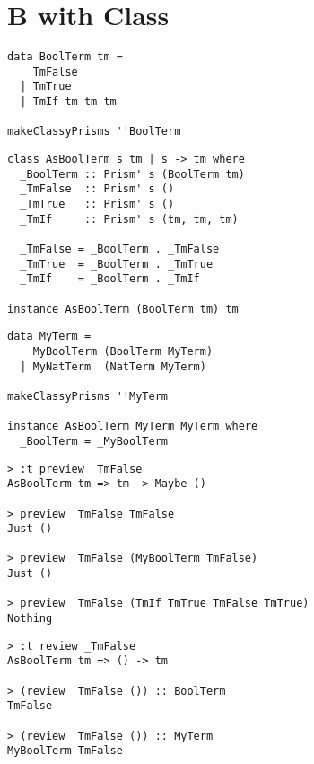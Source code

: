 \documentclass{beamer}
\begin{document}
\section{B with Class}

\begin{frame}[fragile]
  \begin{verbatim}
data BoolTerm tm =
    TmFalse
  | TmTrue
  | TmIf tm tm tm

makeClassyPrisms ''BoolTerm
  \end{verbatim}
\end{frame} 

\begin{frame}[fragile]
  \begin{verbatim}
class AsBoolTerm s tm | s -> tm where
  _BoolTerm :: Prism' s (BoolTerm tm)
  _TmFalse  :: Prism' s ()
  _TmTrue   :: Prism' s ()
  _TmIf     :: Prism' s (tm, tm, tm)

  _TmFalse = _BoolTerm . _TmFalse
  _TmTrue  = _BoolTerm . _TmTrue
  _TmIf    = _BoolTerm . _TmIf

instance AsBoolTerm (BoolTerm tm) tm
  \end{verbatim}
\end{frame} 

\begin{frame}[fragile]
  \begin{verbatim}
data MyTerm =
    MyBoolTerm (BoolTerm MyTerm)
  | MyNatTerm  (NatTerm MyTerm)

makeClassyPrisms ''MyTerm

instance AsBoolTerm MyTerm MyTerm where
  _BoolTerm = _MyBoolTerm
  \end{verbatim}
\end{frame} 

\begin{frame}[fragile]
  \begin{verbatim}
> :t preview _TmFalse
AsBoolTerm tm => tm -> Maybe ()

> preview _TmFalse TmFalse
Just ()

> preview _TmFalse (MyBoolTerm TmFalse)
Just ()

> preview _TmFalse (TmIf TmTrue TmFalse TmTrue)
Nothing
  \end{verbatim}
\end{frame} 

\begin{frame}[fragile]
  \begin{verbatim}
> :t review _TmFalse
AsBoolTerm tm => () -> tm

> (review _TmFalse ()) :: BoolTerm
TmFalse

> (review _TmFalse ()) :: MyTerm
MyBoolTerm TmFalse
  \end{verbatim}
\end{frame} 
\end{document}
